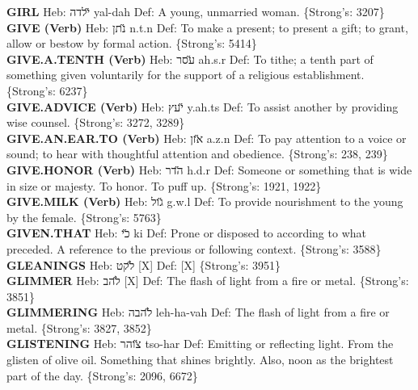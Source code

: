 {\textbf{GIRL} Heb: {\large\H ילדה} yal-dah Def: A young, unmarried woman. \{Strong's: 3207\}\hfill{}\\

\textbf{GIVE (Verb)} Heb: {\large\H נתן} n.t.n Def: To make a present; to present a gift; to grant, allow or bestow by formal action. \{Strong's: 5414\}\hfill{}\\

\textbf{GIVE.A.TENTH (Verb)} Heb: {\large\H עסר} ah.s.r Def: To tithe; a tenth part of something given voluntarily for the support of a religious establishment. \{Strong's: 6237\}\hfill{}\\

\textbf{GIVE.ADVICE (Verb)} Heb: {\large\H יעץ} y.ah.ts Def: To assist another by providing wise counsel. \{Strong's: 3272, 3289\}\hfill{}\\

\textbf{GIVE.AN.EAR.TO (Verb)} Heb: {\large\H אזן} a.z.n Def: To pay attention to a voice or sound; to hear with thoughtful attention and obedience. \{Strong's: 238, 239\}\hfill{}\\

\textbf{GIVE.HONOR (Verb)} Heb: {\large\H הדר} h.d.r Def: Someone or something that is wide in size or majesty. To honor. To puff up. \{Strong's: 1921, 1922\}\hfill{}\\

\textbf{GIVE.MILK (Verb)} Heb: {\large\H גול} g.w.l Def: To provide nourishment to the young by the female. \{Strong's: 5763\}\hfill{}\\

\textbf{GIVEN.THAT} Heb: {\large\H כי} ki Def: Prone or disposed to according to what preceded. A reference to the previous or following context. \{Strong's: 3588\}\hfill{}\\

\textbf{GLEANINGS} Heb: {\large\H לקט} {[}X{]} Def: {[}X{]} \{Strong's: 3951\}\hfill{}\\

\textbf{GLIMMER} Heb: {\large\H להב} {[}X{]} Def: The flash of light from a fire or metal. \{Strong's: 3851\}\hfill{}\\

\textbf{GLIMMERING} Heb: {\large\H להבה} leh-ha-vah Def: The flash of light from a fire or metal. \{Strong's: 3827, 3852\}\hfill{}\\

\textbf{GLISTENING} Heb: {\large\H צוהר} tso-har Def: Emitting or reflecting light. From the glisten of olive oil. Something that shines brightly. Also, noon as the brightest part of the day. \{Strong's: 2096, 6672\}\hfill{}\\

}
